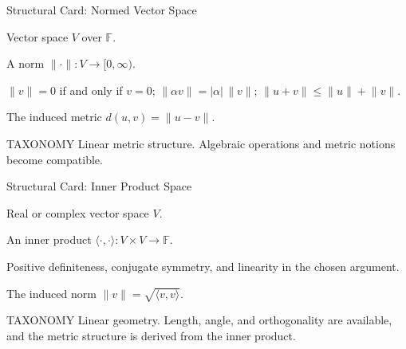 \begin{remark*}
\begin{structureblueprint}{Structural Card: Normed Vector Space}
\begin{structureinherits}
Vector space \(V\) over \(\mathbb F\).
\end{structureinherits}
\begin{structurenew}
A norm \(\lVert\cdot\rVert:V\to[0,\infty)\).
\end{structurenew}
\begin{structuretheory}
\(\lVert v\rVert=0\) if and only if \(v=0\);
\(\lVert\alpha v\rVert=|\alpha|\,\lVert v\rVert\);
\(\lVert u+v\rVert\leq\lVert u\rVert+\lVert v\rVert\).
\end{structuretheory}
\begin{structureusesa}
The induced metric \(d(u,v)=\lVert u-v\rVert\).
\end{structureusesa}
\begin{structuresection}{TAXONOMY}
Linear metric structure.  Algebraic operations and metric notions become
compatible.
\end{structuresection}
\end{structureblueprint}

\begin{structureblueprint}{Structural Card: Inner Product Space}
\begin{structureinherits}
Real or complex vector space \(V\).
\end{structureinherits}
\begin{structurenew}
An inner product \(\langle\cdot,\cdot\rangle:V\times V\to\mathbb F\).
\end{structurenew}
\begin{structuretheory}
Positive definiteness, conjugate symmetry, and linearity in the chosen
argument.
\end{structuretheory}
\begin{structureusesa}
The induced norm \(\lVert v\rVert=\sqrt{\langle v,v\rangle}\).
\end{structureusesa}
\begin{structuresection}{TAXONOMY}
Linear geometry.  Length, angle, and orthogonality are available, and the
metric structure is derived from the inner product.
\end{structuresection}
\end{structureblueprint}


\end{remark*}
